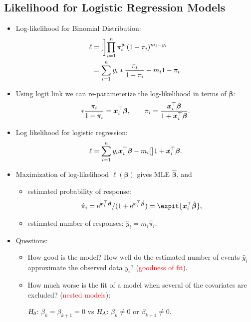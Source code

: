 \documentclass{article}\usepackage[]{graphicx}\usepackage[svgnames]{xcolor}
\let\exp\relax%
\let\log\relax%
\newcommand{\HN}{\textsl{H}_{\textsl{0}}}%
\newcommand{\HA}{\textsl{H}_{\textsl{A}}}%
\providecommand{\Vector}[1]{\bm{#1}}%
\begin{document}
\subsection*{Likelihood for Logistic Regression Models}
\begin{itemize}
      \item Log-likelihood for Binomial Distribution:
            \begin{align*}
                  \ell
                   & =\log[\bigg]{\prod_{i=1}^n \pi_i^{y_i}(1-\pi_i)^{m_i-y_i}}        \\
                   & =\sum_{i=1}^{n} y_i\log*{\frac{\pi_i}{1-\pi_i}}+m_i\log{1-\pi_i}.
            \end{align*}
      \item Using logit link we can re-parameterize the log-likelihood in terms of $ \Vector{\beta} $:
            \[ \log*{\frac{\pi_i}{1-\pi_i}}=\Vector{x}_i^\top \Vector{\beta},\qquad \pi_i=\frac{\exp{\Vector{x}_i^\top \Vector{\beta}}}{1+\exp{\Vector{x}_i^\top \Vector{\beta}}}. \]
      \item Log likelihood for logistic regression:
            \[ \ell=\sum_{i=1}^{n} y_i\Vector{x}_i^\top \Vector{\beta}-m_i\log[\big]{1+\exp{\Vector{x}_i^\top \Vector{\beta}}}. \]
      \item Maximization of log-likelihood $ \ell(\Vector{\beta}) $ gives MLE $ \hat{\Vector{\beta}} $, and
            \begin{itemize}
                  \item estimated probability of response:
                        \[ \hat{\pi}_i=\mathrm{e}^{\Vector{x}_i^\top \hat{\Vector{\beta}}}/(1+\mathrm{e}^{\Vector{x}_i^\top \hat{\Vector{\beta}}})=\expit{\Vector{x}_i^\top \hat{\Vector{\beta}}}, \]
                  \item estimated number of responses: $ \hat{y}_i=m_i\hat{\pi}_i $.
            \end{itemize}
      \item Questions:
            \begin{itemize}
                  \item How good is the model? How well do the estimated number of events $ \hat{y}_i $ approximate the observed data $ y_i $? (\textcolor{Red}{goodness of fit}).
                  \item How much worse is the fit of a model when several of the covariates are excluded? (\textcolor{Red}{nested models}):
                        \begin{center}
                              $ \HN $: $ \beta_k=\beta_{k+1}=0 $ vs $ \HA $: $ \beta_k\ne 0 $ or $ \beta_{k+1}\ne 0 $.
                        \end{center}
            \end{itemize}
\end{itemize}
\end{document}
